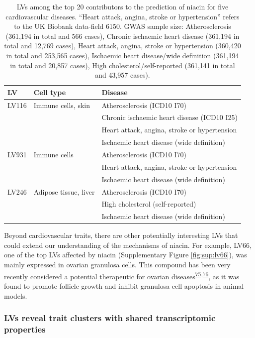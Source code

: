 \documentclass[
  a4paper,
]{article}
\begin{document}
\begin{table}
\caption{LVs among the top 20 contributors to the prediction of niacin for five cardiovascular diseases. ``Heart attack, angina, stroke or hypertension'' refers to the UK Biobank data-field 6150. GWAS sample size: Atherosclerosis (361,194 in total and 566 cases), Chronic ischaemic heart disease (361,194 in total and 12,769 cases), Heart attack, angina, stroke or hypertension (360,420 in total and 253,565 cases), Ischaemic heart disease/wide definition (361,194 in total and 20,857 cases), High cholesterol/self-reported (361,141 in total and 43,957 cases). \label{tbl:niacin:cardio:top_lvs}}\label{tbl:niacin:cardio:top_lvs}%
\centering
\begin{tabular}{lll}
\toprule
LV & Cell type & Disease \\
\midrule
LV116 & Immune cells, skin & Atherosclerosis (ICD10 I70) \\
& & Chronic ischaemic heart disease (ICD10 I25) \\
& & Heart attack, angina, stroke or hypertension \\
& & Ischaemic heart disease (wide definition) \\
LV931 & Immune cells & Atherosclerosis (ICD10 I70) \\
& & Heart attack, angina, stroke or hypertension \\
& & Ischaemic heart disease (wide definition) \\
LV246 & Adipose tissue, liver & Atherosclerosis (ICD10 I70) \\
& & High cholesterol (self-reported) \\
& & Ischaemic heart disease (wide definition) \\
\bottomrule
\end{tabular}
\end{table}

Beyond cardiovascular traits, there are other potentially interesting LVs that could extend our understanding of the mechanisms of niacin.
For example, LV66, one of the top LVs affected by niacin (Supplementary Figure \ref{fig:sup:lv66}), was mainly expressed in ovarian granulosa cells.
This compound has been very recently considered a potential therapeutic for ovarian diseases\textsuperscript{\protect\hyperlink{ref-kLRErKXz}{75},\protect\hyperlink{ref-TovvsrDr}{76}}, as it was found to promote follicle growth and inhibit granulosa cell apoptosis in animal models.

\hypertarget{lvs-reveal-trait-clusters-with-shared-transcriptomic-properties}{%
\subsubsection{LVs reveal trait clusters with shared transcriptomic properties}\label{lvs-reveal-trait-clusters-with-shared-transcriptomic-properties}}
\end{document}
